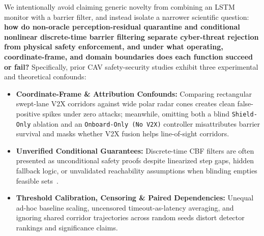 \documentclass[journal]{IEEEtran}
\begin{document}
We intentionally avoid claiming generic novelty from combining an LSTM monitor with a barrier filter, and instead isolate a narrower scientific question: \textbf{how do non-oracle perception-residual quarantine and conditional nonlinear discrete-time barrier filtering separate cyber-threat rejection from physical safety enforcement, and under what operating, coordinate-frame, and domain boundaries does each function succeed or fail?} Specifically, prior CAV safety-security studies exhibit three experimental and theoretical confounds:
\begin{itemize}
    \item \textbf{Coordinate-Frame \& Attribution Confounds:} Comparing rectangular swept-lane V2X corridors against wide polar radar cones creates clean false-positive spikes under zero attacks; meanwhile, omitting both a blind \texttt{Shield-Only} ablation and an \texttt{Onboard-Only (No V2X)} controller misattributes barrier survival and masks whether V2X fusion helps line-of-sight corridors.
    \item \textbf{Unverified Conditional Guarantees:} Discrete-time CBF filters are often presented as unconditional safety proofs despite linearized step gaps, hidden fallback logic, or unvalidated reachability assumptions when blinding empties feasible sets~\cite{dean2020corl,cosner2023rss}.
    \item \textbf{Threshold Calibration, Censoring \& Paired Dependencies:} Unequal ad-hoc baseline scaling, uncensored timeout-as-latency averaging, and ignoring shared corridor trajectories across random seeds distort detector rankings and significance claims.
\end{itemize}
\end{document}
